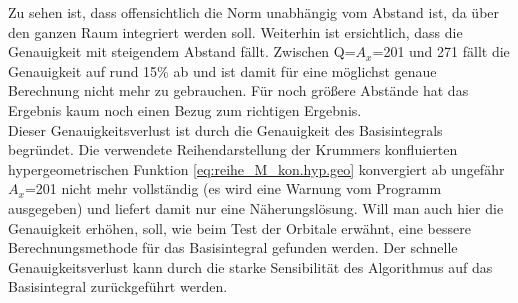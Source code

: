 %
Zu sehen ist, 
dass offensichtlich die Norm unabhängig vom Abstand ist, da über den ganzen 
Raum integriert werden soll. Weiterhin ist ersichtlich, dass die Genauigkeit 
mit steigendem Abstand fällt. Zwischen Q=$A_x$=201  und 
271 fällt die 
Genauigkeit auf rund 15\% ab und ist damit für eine 
möglichst genaue Berechnung 
nicht mehr zu gebrauchen. Für noch größere Abstände hat 
das Ergebnis kaum noch einen Bezug zum richtigen 
Ergebnis.\\
Dieser Genauigkeitsverlust 
ist durch die Genauigkeit des Basisintegrals begründet. Die verwendete 
Reihendarstellung der Krummers konfluierten hypergeometrischen Funktion 
\ref{eq:reihe_M_kon.hyp.geo} konvergiert ab ungefähr $A_x$=201 nicht mehr 
vollständig 
(es wird 
eine Warnung vom Programm ausgegeben) und liefert damit nur eine 
Näherungslösung. Will man auch hier die Genauigkeit erhöhen, soll, wie beim 
Test der Orbitale erwähnt, eine bessere Berechnungsmethode für das 
Basisintegral gefunden werden. Der schnelle Genauigkeitsverlust kann durch die 
starke Sensibilität des Algorithmus auf das 
Basisintegral zurückgeführt werden. \\

